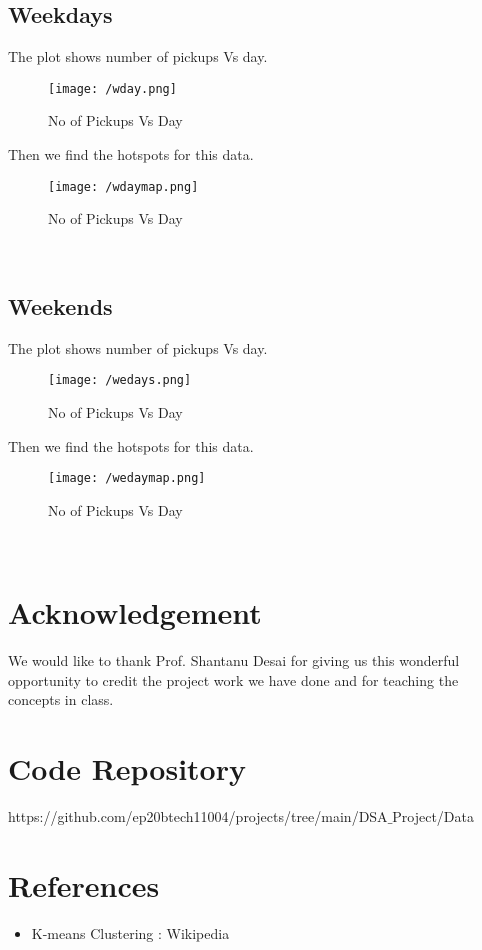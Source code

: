 \documentclass[fleqn]{report}
\begin{document}
  	\subsection{Weekdays}
  	The plot shows number of pickups Vs day.
  	 \begin{figure}[!ht]
  		\centering
  		\texttt{[image: /wday.png]}
  		\caption{No of Pickups Vs Day}
  		\label{fig:wday}
  	\end{figure} 
  	Then we find the hotspots for this data.
  	  	 \begin{figure}[!ht]
  		\centering
  		\texttt{[image: /wdaymap.png]}
  		\caption{No of Pickups Vs Day}
  		\label{fig:wdaymap}
  	\end{figure}\\ 
  	  	\subsection{Weekends}
  	The plot shows number of pickups Vs day.
  	\begin{figure}[!ht]
  		\centering
  		\texttt{[image: /wedays.png]}
  		\caption{No of Pickups Vs Day}
  		\label{fig:weday}
  	\end{figure} 
  	Then we find the hotspots for this data.
  	\begin{figure}[!ht]
  		\centering
  		\texttt{[image: /wedaymap.png]}
  		\caption{No of Pickups Vs Day}
  		\label{fig:wedaymap}
  	\end{figure} \\
	\section{Acknowledgement}
	We would like to thank Prof. Shantanu Desai for giving us this wonderful opportunity to credit the
	project work we have done and for teaching the concepts in class.
	\section{Code Repository}
	https://github.com/ep20btech11004/projects/tree/main/DSA$\_$Project/Data
	\section{References}
	\begin{itemize}
		\item K-means Clustering : Wikipedia 
	\end{itemize}
	 

	
\end{document}
